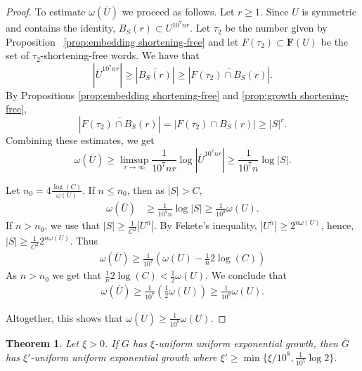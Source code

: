\documentclass[leqno,a4paper,10pt]{amsart}
\theoremstyle{plain}
\newtheorem{thm}{Theorem}[section]
\theoremstyle{definition}
\theoremstyle{remark}
\newcommand{\q}[1]{\overline{#1}}
\newcommand{\F}{\mathbf{F}}
\let\ge\geqslant
\begin{document}
\begin{proof}
To estimate $\omega(\q U)$ we proceed as follows.  Let $r \ge 1$. Since $U$ is symmetric and contains the identity,  
$B_S(r)\subset U^{10^7 n r}.$ Let $\tau_2$ be the number given by Proposition~ \ref{prop:embedding shortening-free} and let $F(\tau_2)\subset \F(U)$ be the set of $\tau_2$-shortening-free words. We have that 
$$|\q U^{10^7nr}|\ge |\q{B_S(r)}|\ge |\q{F(\tau_2)\cap B_S(r)}|.$$
 By Propositions \ref{prop:embedding shortening-free} and \ref{prop:growth shortening-free}, 
$$|\q{F(\tau_2)\cap B_S(r)}|=|F(\tau_2)\cap B_S(r)| \ge |S|^r.$$
Combining these estimates, we get
$$\omega(\overline{U})\geqslant \limsup_{r\to \infty} \frac{1}{10^7 nr}\log |\overline{U}^{10^7nr}|\geqslant \frac{1}{10^7n}\log {|S|}.$$

Let $n_0=4\frac{\log(C)}{\omega(U)}$. 
If $n\leqslant n_0$, then as $|S|>C$,
\begin{align*}
\omega(\overline{U})& \geqslant \frac{1}{10^7n} \log {|S|} \geqslant \frac{1}{10^8}  \omega(U).
\end{align*} 
If $n>n_0$, we use that $|S| \geqslant \frac{1}{C^2}|U^n|$. By Fekete's inequality, $|U^n|\geqslant 2^{n\omega(U)}$, hence, $|S| \geqslant \frac{1}{C^2}2^{n\omega(U)}$. Thus  
\begin{align*}
\omega(\overline{U}) 
\geqslant \frac{1}{10^7} \left(\omega(U)-\frac{1}{n}2\log(C) \right) 
\end{align*} 
As $n>n_0$ we get that $\frac{1}{n}2\log(C)<\frac 12 \omega(U)$. We conclude that 
\begin{align*}
\omega(\overline U) \geqslant \frac 1{10^7}\left(\frac 12 \omega(U)\right) \geqslant \frac{1}{10^8} \omega(U).
\end{align*}

Altogether, this shows that $\omega(\q U)\ge \frac{1}{10^8} \omega(U)$. 
\end{proof}

\begin{thm}%
\label{IT:main2-body}
Let $\xi>0$. If $G$ has $\xi$-uniform uniform exponential growth, then $\q G$ has $\xi'$-uniform uniform exponential growth where $\xi'\ge  \min\{\xi/10^8,\frac{1}{10^5}\log 2\}$.
\end{thm}
\end{document}
